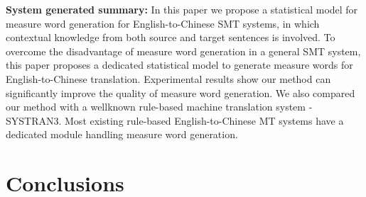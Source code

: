 {\begin{minipage}{0.9\linewidth}
\textbf{System generated summary: }
 In this paper we propose a statistical model for measure word generation for English-to-Chinese SMT systems, in which contextual knowledge from both source and target sentences is involved. To overcome the disadvantage of measure word generation in a general SMT system, this paper proposes a dedicated statistical model to generate measure words for English-to-Chinese translation. Experimental results show our method can significantly improve the quality of measure word generation. We also compared our method with a wellknown rule-based machine translation system - SYSTRAN3. Most existing rule-based English-to-Chinese MT systems have a dedicated module handling measure word generation. 
%

\end{minipage}
}

\section{Conclusions}

